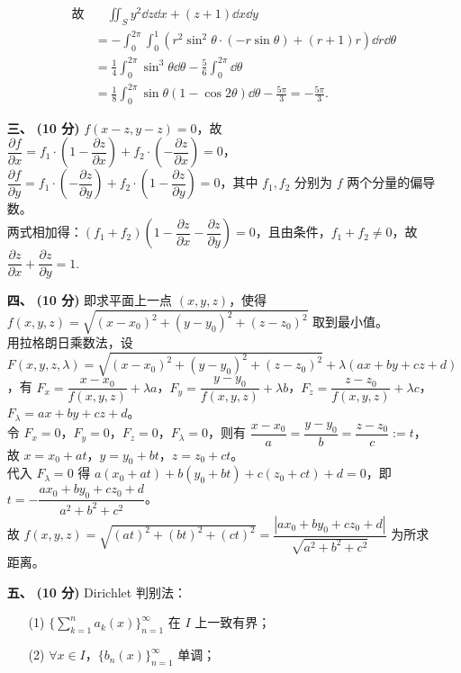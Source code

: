 \documentclass{ctexart}
\begin{document}
\begin{enumerate}
\begin{enumerate}
\begin{align*}
        \text{故}& \quad\iint_Sy^2\dd{z}\dd{x}+(z+1)\dd{x}\dd{y} \\
        &=-\int_0^{2\pi}\int_0^1(r^2\sin^2\theta\cdot (-r\sin\theta)+(r+1)r)\dd{r}\dd{\theta} \\
        &=\frac{1}{4}\int_0^{2\pi}\sin^3\theta\dd{\theta}-\frac{5}{6}\int_0^{2\pi}\dd{\theta} \\
        &=\frac{1}{8}\int_0^{2\pi}\sin\theta(1-\cos 2\theta)\dd{\theta}-\frac{5\pi}{3}=-\frac{5\pi}{3}.
        \end{align*}
    \end{enumerate}
    \item[\textbf{三、}] \textbf{(10 分)} $f(x-z,y-z)=0$，故 $\dfrac{\partial f}{\partial x}=f_1\cdot(1-\dfrac{\partial z}{\partial x})+f_2\cdot(-\dfrac{\partial z}{\partial x})=0$，
    $\dfrac{\partial f}{\partial y}=f_1\cdot(-\dfrac{\partial z}{\partial y})+f_2\cdot(1-\dfrac{\partial z}{\partial y})=0$，其中 $f_1,f_2$ 分别为 $f$ 两个分量的偏导数。\\
    两式相加得：$(f_1+f_2)(1-\dfrac{\partial z}{\partial x}-\dfrac{\partial z}{\partial y})=0$，且由条件，$f_1+f_2\neq 0$，故 $\dfrac{\partial z}{\partial x}+\dfrac{\partial z}{\partial y}=1.$
    \item[\textbf{四、}] \textbf{(10 分)} 即求平面上一点 $(x,y,z)$，使得 $f(x,y,z)=\sqrt{(x-x_0)^2+(y-y_0)^2+(z-z_0)^2}$ 取到最小值。 \\
    用拉格朗日乘数法，设 $F(x,y,z,\lambda)=\sqrt{(x-x_0)^2+(y-y_0)^2+(z-z_0)^2}+\lambda(ax+by+cz+d)$，有 
    $F_x=\dfrac{x-x_0}{f(x,y,z)}+\lambda a$，$F_y=\dfrac{y-y_0}{f(x,y,z)}+\lambda b$，$F_z=\dfrac{z-z_0}{f(x,y,z)}+\lambda c$，$F_\lambda=ax+by+cz+d$。\\
    令 $F_x=0$，$F_y=0$，$F_z=0$，$F_\lambda=0$，则有 $\dfrac{x-x_0}{a}=\dfrac{y-y_0}{b}=\dfrac{z-z_0}{c}:=t$，\\ 
    故 $x=x_0+at$，$y=y_0+bt$，$z=z_0+ct$。\\
    代入 $F_\lambda=0$ 得 $a(x_0+at)+b(y_0+bt)+c(z_0+ct)+d=0$，即 $t=-\dfrac{ax_0+by_0+cz_0+d}{a^2+b^2+c^2}$。\\
    故 $f(x,y,z)=\sqrt{(at)^2+(bt)^2+(ct)^2}=\dfrac{|ax_0+by_0+cz_0+d|}{\sqrt{a^2+b^2+c^2}}$ 为所求距离。
    \item[\textbf{五、}] \textbf{(10 分)} Dirichlet 判别法：
    \begin{enumerate}
        \item[(1)] $\{\displaystyle\sum_{k=1}^na_k(x)\}_{n=1}^{\infty}$ 在 $I$ 上一致有界；
        \item[(2)] $\forall x\in I$，$\{b_n(x)\}_{n=1}^{\infty}$ 单调；

\end{enumerate}
\end{enumerate}
\end{document}
